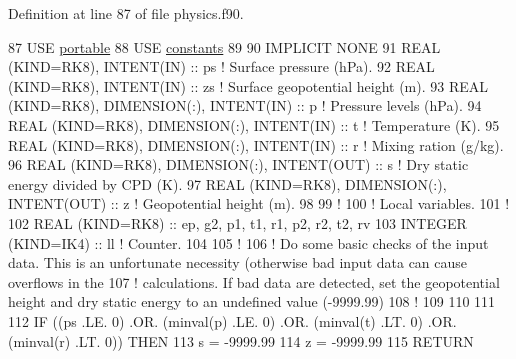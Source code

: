 Definition at line 87 of file physics.\+f90.


\begin{DoxyCode}
87 \textcolor{keywordtype}{USE }\hyperlink{namespaceportable}{portable}
88 \textcolor{keywordtype}{USE }\hyperlink{namespaceconstants}{constants}
89 
90 \textcolor{keywordtype}{IMPLICIT NONE}
91 \textcolor{keywordtype}{REAL (KIND=RK8)}, \textcolor{keywordtype}{INTENT(IN)}                             :: ps       \textcolor{comment}{! Surface pressure (hPa).}
92 \textcolor{keywordtype}{REAL (KIND=RK8)}, \textcolor{keywordtype}{INTENT(IN)}                             :: zs       \textcolor{comment}{! Surface geopotential height (m).}
93 \textcolor{keywordtype}{REAL (KIND=RK8)}, \textcolor{keywordtype}{DIMENSION(:)}, \textcolor{keywordtype}{INTENT(IN)}               :: p        \textcolor{comment}{! Pressure levels (hPa).}
94 \textcolor{keywordtype}{REAL (KIND=RK8)}, \textcolor{keywordtype}{DIMENSION(:)}, \textcolor{keywordtype}{INTENT(IN)}               :: t        \textcolor{comment}{! Temperature (K).}
95 \textcolor{keywordtype}{REAL (KIND=RK8)}, \textcolor{keywordtype}{DIMENSION(:)}, \textcolor{keywordtype}{INTENT(IN)}               :: r        \textcolor{comment}{! Mixing ration (g/kg).}
96 \textcolor{keywordtype}{REAL (KIND=RK8)}, \textcolor{keywordtype}{DIMENSION(:)}, \textcolor{keywordtype}{INTENT(OUT)}              :: s        \textcolor{comment}{! Dry static energy divided by CPD (K).}
97 \textcolor{keywordtype}{REAL (KIND=RK8)}, \textcolor{keywordtype}{DIMENSION(:)}, \textcolor{keywordtype}{INTENT(OUT)}              :: z        \textcolor{comment}{! Geopotential height (m).}
98 
99 \textcolor{comment}{!}
100 \textcolor{comment}{! Local variables.}
101 \textcolor{comment}{!}
102 \textcolor{keywordtype}{REAL (KIND=RK8)}                                         :: ep, g2, p1, t1, r1, p2, r2, t2, rv
103 \textcolor{keywordtype}{INTEGER (KIND=IK4)}                                      :: ll       \textcolor{comment}{! Counter.}
104 
105 \textcolor{comment}{!}
106 \textcolor{comment}{! Do some basic checks of the input data. This is an unfortunate necessity (otherwise bad input data can
       cause overflows in the}
107 \textcolor{comment}{! calculations. If bad data are detected, set the geopotential height and dry static energy to an undefined
       value (-9999.99)}
108 \textcolor{comment}{!}
109 
110 
111 
112 \textcolor{keywordflow}{IF} ((ps .LE. 0) .OR. (minval(p) .LE. 0) .OR. (minval(t) .LT. 0) .OR. (minval(r) .LT. 0)) \textcolor{keywordflow}{THEN}
113     s   = -9999.99
114     z   = -9999.99
115     \textcolor{keywordflow}{RETURN}

\end{DoxyCode}
